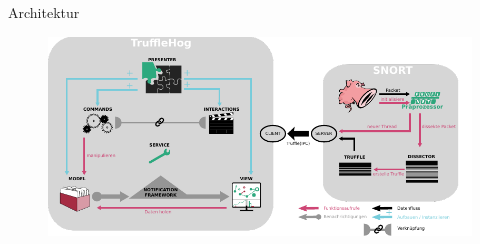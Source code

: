 \begin{frame}{Architektur}
    \begin{figure}
    	\centering
    	\includegraphics[width=\textwidth]{./images/arch/17.pdf}
    \end{figure}
\end{frame}
